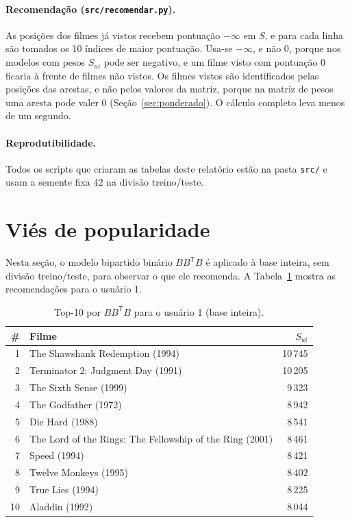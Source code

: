 \documentclass[12pt,a4paper]{article}
\theoremstyle{definition}
\begin{document}
\paragraph{Recomendação (\texttt{src/recomendar.py}).}
As posições dos filmes já vistos recebem pontuação $-\infty$ em $S$, e para
cada linha são tomados os 10 índices de maior pontuação. Usa-se $-\infty$, e
não 0, porque nos modelos com pesos $S_{ui}$ pode ser negativo, e um filme
visto com pontuação 0 ficaria à frente de filmes não vistos. Os filmes
vistos são identificados pelas posições das arestas, e não pelos valores
da matriz, porque na matriz de pesos uma aresta pode valer 0
(Seção~\ref{sec:ponderado}). O cálculo completo leva menos de um segundo.

\paragraph{Reprodutibilidade.}
Todos os scripts que criaram as tabelas deste relatório estão na
pasta \texttt{src/} e usam a semente fixa 42 na divisão treino/teste.

\section{Viés de popularidade}\label{sec:vies}

Nesta seção, o modelo bipartido binário $BB^{\mathsf T}B$ é aplicado à base inteira, sem divisão treino/teste, para observar o que ele recomenda. A
Tabela~\ref{tab:top10} mostra as recomendações para o usuário 1.

\begin{table}[ht]
\centering
\begin{tabular}{rlr}
\toprule
\# & Filme & $S_{ui}$ \\
\midrule
1  & The Shawshank Redemption (1994) & 10\,745 \\
2  & Terminator 2: Judgment Day (1991) & 10\,205 \\
3  & The Sixth Sense (1999) & 9\,323 \\
4  & The Godfather (1972) & 8\,942 \\
5  & Die Hard (1988) & 8\,541 \\
6  & The Lord of the Rings: The Fellowship of the Ring (2001) & 8\,461 \\
7  & Speed (1994) & 8\,421 \\
8  & Twelve Monkeys (1995) & 8\,402 \\
9  & True Lies (1994) & 8\,225 \\
10 & Aladdin (1992) & 8\,044 \\
\bottomrule
\end{tabular}
\caption{Top-10 por $BB^{\mathsf T}B$ para o usuário 1 (base inteira).}
\label{tab:top10}
\end{table}
\end{document}
